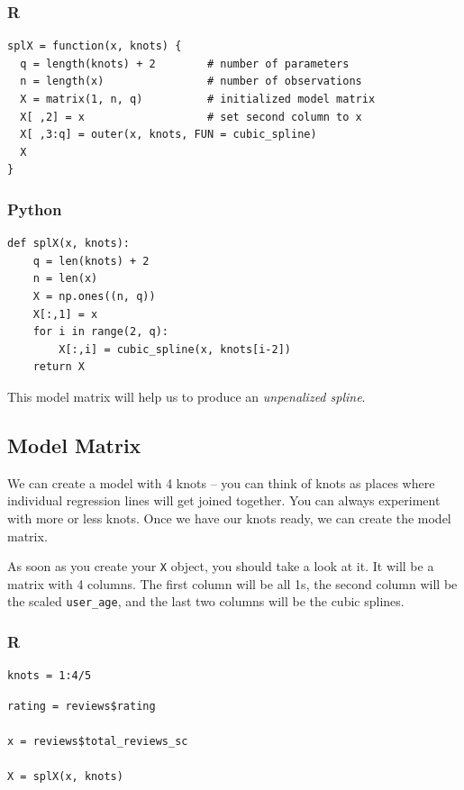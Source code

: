 \documentclass[
  letterpaper,
]{krantz}
\begin{document}
\subsubsection{R}

\begin{verbatim}
splX = function(x, knots) {
  q = length(knots) + 2        # number of parameters
  n = length(x)                # number of observations
  X = matrix(1, n, q)          # initialized model matrix
  X[ ,2] = x                   # set second column to x
  X[ ,3:q] = outer(x, knots, FUN = cubic_spline) 
  X
}
\end{verbatim}

\subsubsection{Python}

\begin{verbatim}
def splX(x, knots):
    q = len(knots) + 2
    n = len(x)
    X = np.ones((n, q))
    X[:,1] = x
    for i in range(2, q):
        X[:,i] = cubic_spline(x, knots[i-2])
    return X
\end{verbatim}

This model matrix will help us to produce an \emph{unpenalized spline}.

\subsection{Model Matrix}\label{sec-gam-model-matrix}

We can create a model with 4 knots -- you can think of knots as places
where individual regression lines will get joined together. You can
always experiment with more or less knots. Once we have our knots ready,
we can create the model matrix.

As soon as you create your \texttt{X} object, you should take a look at
it. It will be a matrix with 4 columns. The first column will be all 1s,
the second column will be the scaled \texttt{user\_age}, and the last
two columns will be the cubic splines.

\subsubsection{R}

\begin{verbatim}
knots = 1:4/5
\end{verbatim}

\begin{verbatim}
rating = reviews$rating

x = reviews$total_reviews_sc

X = splX(x, knots)            
\end{verbatim}
\end{document}
